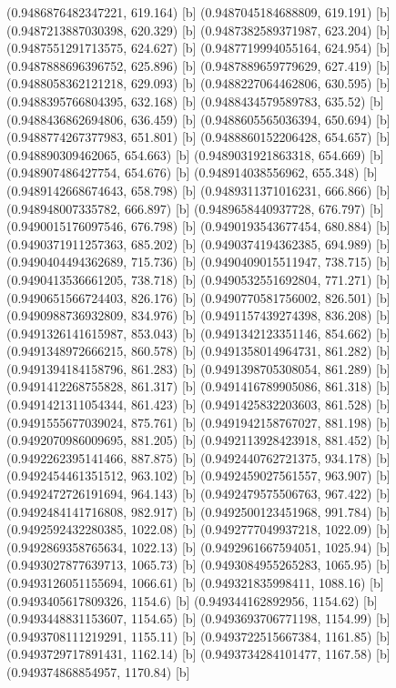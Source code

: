{{{(0.9486876482347221, 619.164) [b] 
(0.9487045184688809, 619.191) [b] 
(0.9487213887030398, 620.329) [b] 
(0.9487382589371987, 623.204) [b] 
(0.9487551291713575, 624.627) [b] 
(0.9487719994055164, 624.954) [b] 
(0.9487888696396752, 625.896) [b] 
(0.9487889659779629, 627.419) [b] 
(0.9488058362121218, 629.093) [b] 
(0.9488227064462806, 630.595) [b] 
(0.9488395766804395, 632.168) [b] 
(0.9488434579589783, 635.52) [b] 
(0.9488436862694806, 636.459) [b] 
(0.9488605565036394, 650.694) [b] 
(0.9488774267377983, 651.801) [b] 
(0.9488860152206428, 654.657) [b] 
(0.948890309462065, 654.663) [b] 
(0.9489031921863318, 654.669) [b] 
(0.948907486427754, 654.676) [b] 
(0.948914038556962, 655.348) [b] 
(0.9489142668674643, 658.798) [b] 
(0.9489311371016231, 666.866) [b] 
(0.948948007335782, 666.897) [b] 
(0.9489658440937728, 676.797) [b] 
(0.9490015176097546, 676.798) [b] 
(0.9490193543677454, 680.884) [b] 
(0.9490371911257363, 685.202) [b] 
(0.9490374194362385, 694.989) [b] 
(0.9490404494362689, 715.736) [b] 
(0.9490409015511947, 738.715) [b] 
(0.9490413536661205, 738.718) [b] 
(0.9490532551692804, 771.271) [b] 
(0.9490651566724403, 826.176) [b] 
(0.9490770581756002, 826.501) [b] 
(0.9490988736932809, 834.976) [b] 
(0.9491157439274398, 836.208) [b] 
(0.9491326141615987, 853.043) [b] 
(0.9491342123351146, 854.662) [b] 
(0.9491348972666215, 860.578) [b] 
(0.9491358014964731, 861.282) [b] 
(0.9491394184158796, 861.283) [b] 
(0.9491398705308054, 861.289) [b] 
(0.9491412268755828, 861.317) [b] 
(0.9491416789905086, 861.318) [b] 
(0.9491421311054344, 861.423) [b] 
(0.9491425832203603, 861.528) [b] 
(0.9491555677039024, 875.761) [b] 
(0.9491942158767027, 881.198) [b] 
(0.9492070986009695, 881.205) [b] 
(0.9492113928423918, 881.452) [b] 
(0.9492262395141466, 887.875) [b] 
(0.9492440762721375, 934.178) [b] 
(0.9492454461351512, 963.102) [b] 
(0.9492459027561557, 963.907) [b] 
(0.9492472726191694, 964.143) [b] 
(0.9492479575506763, 967.422) [b] 
(0.9492484141716808, 982.917) [b] 
(0.9492500123451968, 991.784) [b] 
(0.9492592432280385, 1022.08) [b] 
(0.9492777049937218, 1022.09) [b] 
(0.9492869358765634, 1022.13) [b] 
(0.9492961667594051, 1025.94) [b] 
(0.9493027877639713, 1065.73) [b] 
(0.9493084955265283, 1065.95) [b] 
(0.9493126051155694, 1066.61) [b] 
(0.949321835998411, 1088.16) [b] 
(0.9493405617809326, 1154.6) [b] 
(0.949344162892956, 1154.62) [b] 
(0.9493448831153607, 1154.65) [b] 
(0.9493693706771198, 1154.99) [b] 
(0.9493708111219291, 1155.11) [b] 
(0.9493722515667384, 1161.85) [b] 
(0.9493729717891431, 1162.14) [b] 
(0.9493734284101477, 1167.58) [b] 
(0.949374868854957, 1170.84) [b] 
}}}
